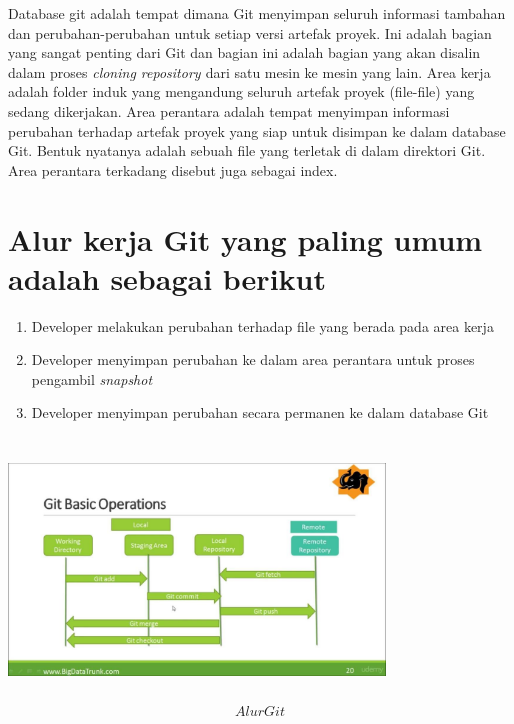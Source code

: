\noindent 
Database git adalah tempat dimana Git menyimpan seluruh informasi tambahan dan perubahan-perubahan untuk setiap versi artefak proyek. Ini adalah bagian yang sangat penting dari Git dan bagian ini adalah bagian yang akan disalin dalam proses \textit{cloning repository $  $}dari satu mesin ke mesin yang lain. Area kerja adalah folder induk yang mengandung seluruh artefak proyek (file-file) yang sedang dikerjakan. Area perantara adalah tempat menyimpan informasi perubahan terhadap artefak proyek yang siap untuk disimpan ke dalam database Git. Bentuk nyatanya adalah sebuah file yang terletak di dalam direktori Git. Area perantara terkadang disebut juga sebagai index.\vspace{\baselineskip}
\section{Alur kerja Git yang paling umum adalah sebagai berikut} \par


\begin{enumerate}


\item Developer melakukan perubahan terhadap file yang berada pada area kerja \par
\item Developer menyimpan perubahan ke dalam area perantara untuk proses pengambil \textit{snapshot} \par
\item Developer menyimpan perubahan secara permanen ke dalam database Git \par
\vspace{12pt}
\vspace{12pt}
\noindent 
\end {enumerate}


\includegraphics[width=10cm,height=7cm]{Figures/dapgit4.jpg}
\begin{equation}Alur Git \end{equation}

